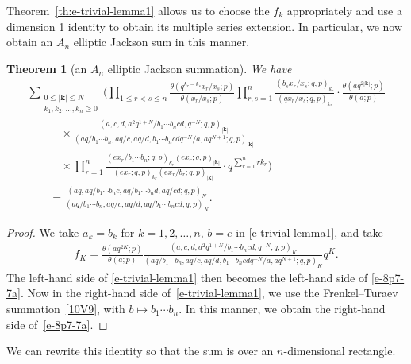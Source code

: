 \documentclass[pdftex]{sigma}
\numberwithin{equation}{section}
\newtheorem{Theorem}{Theorem}[section]
\newcommand\sumk{{\left| \boldsymbol{k} \right|}}
\newcommand{\triprod}[1]{\prod\limits_{1\le r < s \le #1}}
\newcommand{\sqprod}[1]{\prod\limits_{r, s =1}^{#1}} %
\newcommand{\smallprod}[1]{\prod\limits_{r =1}^{#1}} %
\newcommand{\xover}[1]{#1_{r}/#1_{s}}
\newcommand{\ellipticqrfac}[2]{{\left({#1}; q, p\right)_{#2}}} %
\newcommand{\elliptictheta}[1]{\theta \left({#1} ; p\right) }
\newcommand{\ellipticvandermonde}[3]{\triprod{#3} %
\!\! \frac{\elliptictheta{q^{#2_r-#2_s} \xover {#1} }}{\elliptictheta{\xover{#1}}}
}
\begin{document}
Theorem~\ref{th:e-trivial-lemma1} allows us to choose the $f_k$ appropriately and use a dimension 1 identity to obtain its multiple series extension. In particular, we now obtain an $A_n$ elliptic Jackson sum in this manner.
\begin{Theorem}[an $A_n$ elliptic Jackson summation]\label{th:e-8p7-7a} We have
\begin{gather}
\sum\limits_{\substack{0\leq \sumk \leq N \\ k_1,k_2, \dots, k_n\geq 0} }
 \Bigg( \ellipticvandermonde{x}{k}{n}
\sqprod n \frac{\ellipticqrfac{b_s\xover{x}}{k_r} }{\ellipticqrfac{q\xover{x}}{k_r} }
\cdot \frac{\elliptictheta{aq^{2\sumk}}}
{\elliptictheta{a}}\nonumber\\
\qquad\quad {} \times \frac {\ellipticqrfac{ a, c, d, a^2q^{1+N}/b_1\cdots b_n c d, q^{-N}}{\sumk}}
{\ellipticqrfac{ aq/b_1\cdots b_n , aq/c, aq/d, b_1\cdots b_n c dq^{-N}/a, aq^{N+1}}{\sumk}}
\nonumber\\
\qquad\quad{} \times \smallprod n \frac{\ellipticqrfac{ex_r/b_1\cdots b_n}{k_r} \ellipticqrfac{ex_r}{\sumk}}
{\ellipticqrfac{ex_r}{k_r} \ellipticqrfac{ex_r/b_r}{\sumk}} \cdot q^{\sum\limits_{r=1}^n rk_r}\Bigg)\nonumber\\
 \qquad{} = \frac
{\ellipticqrfac{aq, aq/b_1\cdots b_n c, aq/b_1\cdots b_n d, aq/cd}{N}}
{\ellipticqrfac{aq/b_1\cdots b_n , aq/c, aq/d, aq/b_1\cdots b_n c d}{N}} .\label{e-8p7-7a}
\end{gather}
\end{Theorem}
\begin{proof}
We take $a_k=b_k$ for $k=1, 2, \dots, n$, $b=e$ in \eqref{e-trivial-lemma1}, and take
\begin{gather*}f_K= \frac {\elliptictheta{aq^{2K}}}{\elliptictheta{a}}\frac{\ellipticqrfac{ a, c, d, a^2q^{1+N}/b_1\cdots b_n c d, q^{-N} }{K}}
{\ellipticqrfac{ aq/b_1\cdots b_n , aq/c, aq/d, b_1\cdots b_n c dq^{-N}/a, aq^{N+1}}{K}} q^{K}.
\end{gather*}
The left-hand side of \eqref{e-trivial-lemma1} then becomes the left-hand side of \eqref{e-8p7-7a}. Now in the right-hand side of~\eqref{e-trivial-lemma1}, we use the Frenkel--Turaev summation~\eqref{10V9}, with $b\mapsto b_1\cdots b_n$. In this manner, we obtain the right-hand side of~\eqref{e-8p7-7a}.
\end{proof}

We can rewrite this identity so that the sum is over an $n$-dimensional rectangle.
\end{document}
